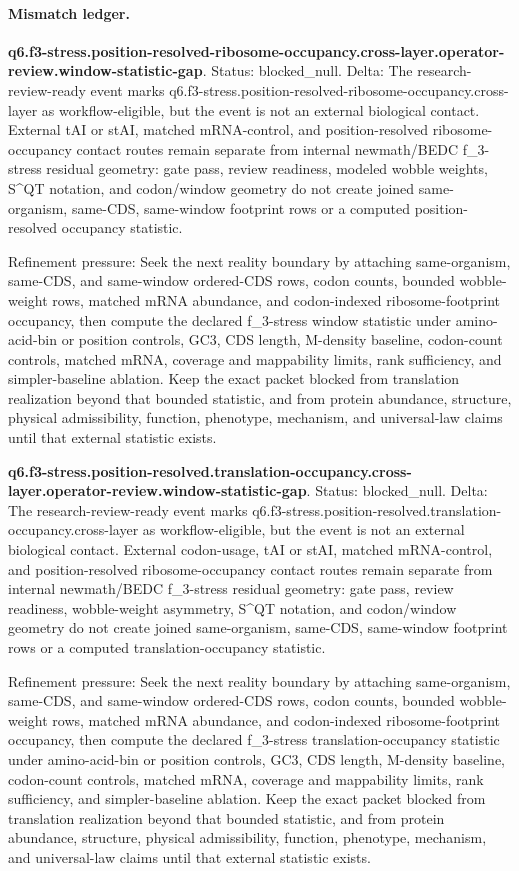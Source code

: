 \paragraph{Mismatch ledger.}
\textbf{q6.f3-stress.position-resolved-ribosome-occupancy.cross-layer.operator-review.window-statistic-gap}. Status: blocked\_null. Delta: The research-review-ready event marks q6.f3-stress.position-resolved-ribosome-occupancy.cross-layer as workflow-eligible, but the event is not an external biological contact. External tAI or stAI, matched mRNA-control, and position-resolved ribosome-occupancy contact routes remain separate from internal newmath/BEDC f\_3-stress residual geometry: gate pass, review readiness, modeled wobble weights, S\textasciicircum{}QT notation, and codon/window geometry do not create joined same-organism, same-CDS, same-window footprint rows or a computed position-resolved occupancy statistic.

Refinement pressure: Seek the next reality boundary by attaching same-organism, same-CDS, and same-window ordered-CDS rows, codon counts, bounded wobble-weight rows, matched mRNA abundance, and codon-indexed ribosome-footprint occupancy, then compute the declared f\_3-stress window statistic under amino-acid-bin or position controls, GC3, CDS length, M-density baseline, codon-count controls, matched mRNA, coverage and mappability limits, rank sufficiency, and simpler-baseline ablation. Keep the exact packet blocked from translation realization beyond that bounded statistic, and from protein abundance, structure, physical admissibility, function, phenotype, mechanism, and universal-law claims until that external statistic exists.

\textbf{q6.f3-stress.position-resolved.translation-occupancy.cross-layer.operator-review.window-statistic-gap}. Status: blocked\_null. Delta: The research-review-ready event marks q6.f3-stress.position-resolved.translation-occupancy.cross-layer as workflow-eligible, but the event is not an external biological contact. External codon-usage, tAI or stAI, matched mRNA-control, and position-resolved ribosome-occupancy contact routes remain separate from internal newmath/BEDC f\_3-stress residual geometry: gate pass, review readiness, wobble-weight asymmetry, S\textasciicircum{}QT notation, and codon/window geometry do not create joined same-organism, same-CDS, same-window footprint rows or a computed translation-occupancy statistic.

Refinement pressure: Seek the next reality boundary by attaching same-organism, same-CDS, and same-window ordered-CDS rows, codon counts, bounded wobble-weight rows, matched mRNA abundance, and codon-indexed ribosome-footprint occupancy, then compute the declared f\_3-stress translation-occupancy statistic under amino-acid-bin or position controls, GC3, CDS length, M-density baseline, codon-count controls, matched mRNA, coverage and mappability limits, rank sufficiency, and simpler-baseline ablation. Keep the exact packet blocked from translation realization beyond that bounded statistic, and from protein abundance, structure, physical admissibility, function, phenotype, mechanism, and universal-law claims until that external statistic exists.

